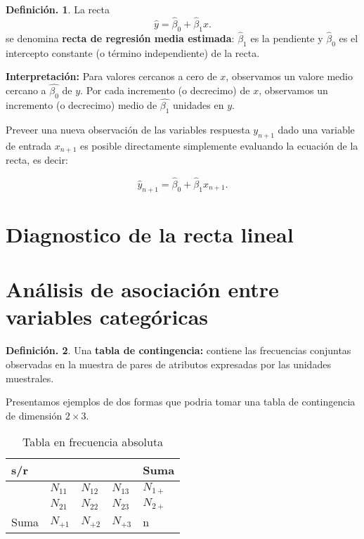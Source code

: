 \documentclass[]{book}
\theoremstyle{definition}
\newtheorem{definition}{Definición.}[chapter]
\theoremstyle{definition}
\theoremstyle{definition}
\theoremstyle{remark}
\begin{document}
\begin{definition}
\protect\hypertarget{def:unnamed-chunk-109}{}{\label{def:unnamed-chunk-109} }La recta
\[ \widehat{y} = \widehat{\beta}_0 +
\widehat{\beta}_1x.\]
se denomina \textbf{recta de regresión media estimada}:
\(\widehat{\beta}_1\) es la pendiente y
\(\widehat{\beta}_0\) es el
intercepto constante (o término independiente) de
la recta.
\end{definition}

\textbf{Interpretación:} Para valores cercanos a cero
de \(x\), observamos un valore medio cercano a
\(\widehat{\beta_0}\) de \(y\). Por cada incremento
(o decrecimo) de \(x\), observamos un incremento (o
decrecimo) medio de \(\widehat{\beta_1}\) unidades
en \(y\).

Preveer una nueva observación de las variables respuesta
\(y_{n+1}\) dado una variable de entrada \(x_{n+1}\) es
posible directamente simplemente evaluando la ecuación
de la recta, es decir:

\[ \widehat{y}_{n+1} = \widehat{\beta}_0 +
\widehat{\beta}_1x_{n+1}.
\]

\hypertarget{diagnostico-de-la-recta-lineal}{%
\section{Diagnostico de la recta lineal}\label{diagnostico-de-la-recta-lineal}}

\hypertarget{anuxe1lisis-de-asociaciuxf3n-entre-variables-categuxf3ricas}{%
\section{Análisis de asociación entre variables categóricas}\label{anuxe1lisis-de-asociaciuxf3n-entre-variables-categuxf3ricas}}

\begin{definition}
\protect\hypertarget{def:unnamed-chunk-110}{}{\label{def:unnamed-chunk-110} }Una \textbf{tabla de contingencia:} contiene las frecuencias
conjuntas observadas en la muestra de pares de atributos
expresadas por las unidades muestrales.
\end{definition}

Presentamos ejemplos de dos formas que podria tomar una
tabla de contingencia de dimensión \(2\times 3\).

\begin{table}[!htbp]
\centering
\caption{Tabla en frecuencia absoluta}
\label{mm}
\begin{tabular}{|l|l|l|l|l|}
\hline
s/r  &                 &  &  & \mbox{Suma}  \\ \hline
  &        $N_{11}$ & $N_{12}$  & $N_{13}$  & $N_{1+}$  \\ \hline
 &        $N_{21}$ & $N_{22}$  & $N_{23}$  &  $N_{2+}$ \\ \hline
\mbox{Suma} & $N_{+1}$ & $N_{+2}$ & $N_{+3}$  &  n \\ \hline
\end{tabular}
\end{table}
\end{document}
